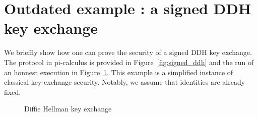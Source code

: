 \section{Outdated example : a signed DDH key exchange}

We brieffly show how one can prove the security of a signed DDH key exchange. The protocol in pi-calculus is provided in Figure~\ref{fig:signed_ddh} and the run of an honnest execution in Figure~\ref{fig:dh_ke}. This example is a simplified instance of classical key-exchange security. Notably, we assume that identities are already fixed.

\begin{figure}
    \setmsckeyword{} 
    \begin{center}
    \begin{msc}{}
        \setlength{\instwidth}{0\mscunit}
        \setlength{\instdist}{7cm}
        \setlength{\topheaddist}{0cm}


        \nextlevel[-1]
        \nextlevel[1.5]
         \nextlevel[1.5]




       \end{msc}
       \end{center}
    \caption{Diffie Hellman key exchange}\label{fig:dh_ke}
\end{figure}

